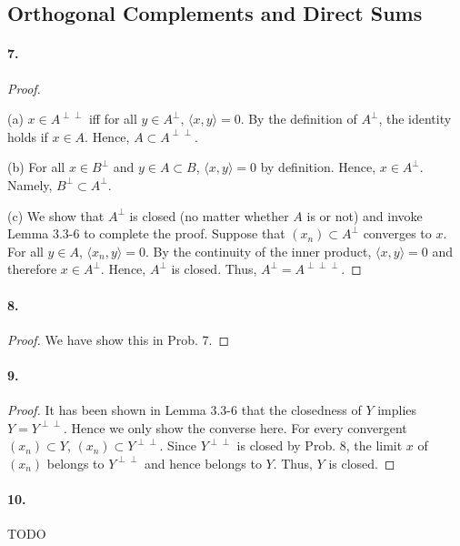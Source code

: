 \subsection{Orthogonal Complements and Direct Sums}
  \paragraph{7.}
  \begin{proof}
    $\,$\par
    (a) $x\in A^{\perp\perp}$ iff for all $y\in A^\perp$, $\langle x, y\rangle=
    0$. By the definition of $A^\perp$, the identity holds if $x\in A$. Hence,
    $A\subset A^{\perp\perp}$.\par
    (b) For all $x\in B^\perp$ and $y\in A\subset B$, $\langle x, y\rangle=0$ by
    definition. Hence, $x\in A^\perp$. Namely, $B^\perp\subset A^\perp$.\par
    (c) We show that $A^\perp$ is closed (no matter whether $A$ is or not) and
    invoke Lemma 3.3-6 to complete the proof. Suppose that $(x_n)\subset 
    A^\perp$ converges to $x$. For all $y\in A$, $\langle x_n, y\rangle=0$. By
    the continuity of the inner product, $\langle x, y\rangle=0$ and therefore
    $x\in A^\perp$. Hence, $A^\perp$ is closed. Thus, $A^\perp=A^{\perp\perp
    \perp}$.
  \end{proof}
  
  \paragraph{8.}
  \begin{proof}
    We have show this in Prob. 7.
  \end{proof}
  
  \paragraph{9.}
  \begin{proof}
    It has been shown in Lemma 3.3-6 that the closedness of $Y$ implies $Y=Y^{
    \perp\perp}$. Hence we only show the converse here. For every convergent 
    $(x_n)\subset Y$, $(x_n)\subset Y^{\perp\perp}$. Since $Y^{\perp\perp}$ is
    closed by Prob. 8, the limit $x$ of $(x_n)$ belongs to $Y^{\perp\perp}$ and
    hence belongs to $Y$. Thus, $Y$ is closed.
  \end{proof}
  
  \paragraph{10.} TODO


















